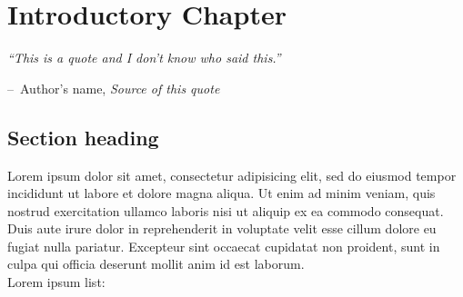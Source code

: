 \documentclass[a4paper,11pt,openany]{book}
\makeatletter
\newenvironment{chapquote}[2][2em]
  {\setlength{\@tempdima}{#1}%
   \def\chapquote@author{#2}%
   \parshape 1 \@tempdima \dimexpr\textwidth-2\@tempdima\relax%
   \itshape}
  {\par\normalfont\hfill--\ \chapquote@author\hspace*{\@tempdima}\par\bigskip}
\makeatother
\begin{document}




\chapter{Introductory Chapter}

\begin{chapquote}{Author's name, \textit{Source of this quote}}
``This is a quote and I don't know who said this.''
\end{chapquote}

\section{Section heading}
Lorem ipsum dolor sit amet, consectetur adipisicing elit, sed do eiusmod tempor incididunt ut labore et dolore magna aliqua. Ut enim ad minim veniam, quis nostrud exercitation ullamco laboris nisi ut aliquip ex ea commodo consequat. \\ Duis aute irure dolor in reprehenderit in voluptate velit esse cillum dolore eu fugiat nulla pariatur. Excepteur sint occaecat cupidatat non proident, sunt in culpa qui officia deserunt mollit anim id est laborum. \\ Lorem ipsum list:
\end{document}
